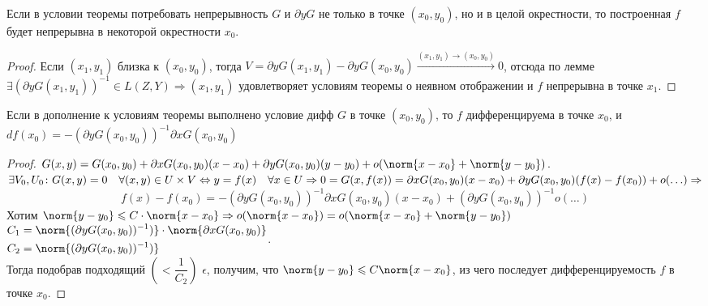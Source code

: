 \begin{theorem}
   Если в условии теоремы  потребовать непрерывность $G$ и $\partial y G$ не только в точке $(x_0, y_0)$, но и в целой окрестности, то построенная $f$ будет непрерывна в некоторой окрестности $x_0$.
\end{theorem}
\begin{proof}
    Если $(x_1, y_1)$ близка к $(x_0, y_0)$, тогда $V = \partial y G(x_1, y_1) - \partial y G(x_0, y_0) \stackrel{(x_1, y_1) \to (x_0, y_0)}{\longrightarrow} 0$, отсюда по лемме $\exists (\partial y G(x_1, y_1))^{-1} \in L(Z, Y) \Rightarrow (x_1, y_1)$ удовлетворяет условиям теоремы о неявном отображении и $f$ непрерывна в точке $x_1$.
\end{proof}

\begin{theorem}
    Если в дополнение к условиям теоремы  выполнено условие дифф $G$ в точке $(x_0, y_0)$, то $f$ дифференцируема в точке $x_0$, и $d f(x_0) = - (\partial y G(x_0, y_0))^{-1} \partial x G(x_0, y_0)$
\end{theorem}
\begin{proof}
    $G(x,y) = G(x_0, y_0) + \partial x G(x_0, y_0) (x - x_0) + \partial y G(x_0, y_0) (y - y_0) + o (\norm{x - x_0} + \norm{y - y_0})$.\\
    $\exists V_0, U_0 \colon G(x, y) = 0 \quad \forall (x, y) \in U \times V \Leftrightarrow y = f(x) \quad \forall x \in U \Rightarrow \\ 0 = G(x, f(x)) = \partial x G(x_0, y_0) (x - x_0) + \partial y G(x_0, y_0) (f(x) - f(x_0)) + o(\ldots) \Rightarrow$
    \begin{equation}
        \label{*}
        f(x) - f(x_0) = - (\partial y G(x_0, y_0))^{-1} \partial x G(x_0, y_0) (x - x_0) + (\partial y G(x_0, y_0))^{-1}o(\ldots)
    \end{equation}
    Хотим $\norm{y - y_0} \leqslant C \cdot \norm{x - x_0} \Rightarrow o(\norm{x - x_0}) = o(\norm{x - x_0} + \norm{y - y_0})$\\
    $\begin{aligned}
    C_1 &= \norm{(\partial y G(x_0, y_0))^{-1})} \cdot \norm{\partial x G(x_0, y_0)} \\
    C_2 &= \norm{(\partial y G(x_0, y_0))^{-1})}
    \end{aligned}$.\\
    Тогда подобрав подходящий $\left(< \dfrac{1}{C_2}\right)$ $\epsilon$, получим, что $\norm{y - y_0} \leqslant C \norm{x - x_0}$, из чего последует дифференцируемость $f$ в точке $x_0$.
\end{proof}

